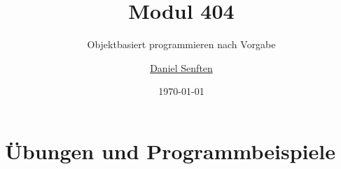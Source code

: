 \documentclass{manual}
\title{Modul 404}
\subtitle{Objektbasiert programmieren nach Vorgabe}
\date{\today}
\author{\href{mailto:daniel.senften@talent-factory.ch}{Daniel Senften}}
\begin{document}
    
    \setmonofont{Verdana}

    

    \newpage\appendix
    \section{Übungen und Programmbeispiele}
    \listofexercises

    \renewcommand{\listoflistingscaption}{Programmbeispiele}
    \newpage\listoflistings

    \newpage\listoffixmes
\end{document}
